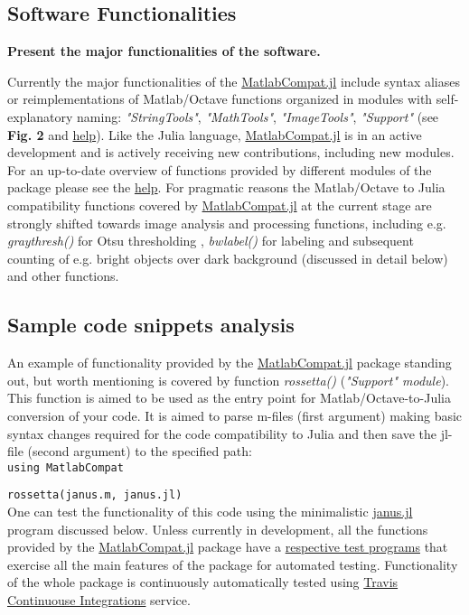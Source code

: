 \subsection{Software Functionalities}

\textbf{Present the major functionalities of the software.}

Currently the major functionalities of the \href{https://github.com/MatlabCompat/MatlabCompat.jl}{MatlabCompat.jl} include syntax aliases or reimplementations of Matlab/Octave functions organized in modules with self-explanatory naming: \textit{"StringTools"}, \textit{"MathTools"}, \textit{"ImageTools"}, \textit{"Support"} (see \textbf{Fig. 2} and \href{http://matlabcompat.github.io/help.html}{help}). Like the Julia language, \href{https://github.com/MatlabCompat/MatlabCompat.jl}{MatlabCompat.jl} is in an active development and is actively receiving new contributions, including new modules. For an up-to-date overview of functions provided by different modules of the package please see the \href{http://matlabcompat.github.io/help.html}{help}. For pragmatic reasons the Matlab/Octave to Julia compatibility functions covered by \href{https://github.com/MatlabCompat/MatlabCompat.jl}{MatlabCompat.jl} at the current stage are strongly shifted towards image analysis and processing functions, including e.g. \textit{graythresh()} for Otsu thresholding \cite{otsu1975threshold}, \textit{bwlabel()} for labeling and subsequent counting of e.g. bright objects over dark background (discussed in detail below) and other functions.

\subsection{Sample code snippets analysis}

An example of functionality provided by the \href{https://github.com/MatlabCompat/MatlabCompat.jl}{MatlabCompat.jl} package standing out, but worth mentioning is covered by function \textit{rossetta()} (\textit{"Support" module}). This function is aimed to be used as the entry point for Matlab/Octave-to-Julia conversion of your code. It is aimed to parse m-files (first argument) making basic syntax changes required for the code compatibility to Julia and then save the jl-file (second argument) to the specified path:\\

\verb|using MatlabCompat|

\verb|rossetta(janus.m, janus.jl)|\\

One can test the functionality of this code using the minimalistic \href{https://github.com/MatlabCompat/MatlabCompat.jl/blob/dev/test/janus.m}{janus.jl} program discussed below. Unless currently in development, all the functions provided by the \href{https://github.com/MatlabCompat/MatlabCompat.jl}{MatlabCompat.jl} package have a \href{https://github.com/MatlabCompat/MatlabCompat.jl/tree/master/test}{respective test programs} that exercise all the main features of the package for automated testing. Functionality of the whole package is continuously automatically tested using \href{https://travis-ci.org/MatlabCompat/MatlabCompat.jl}{Travis Continuouse Integrations} service.
  
  